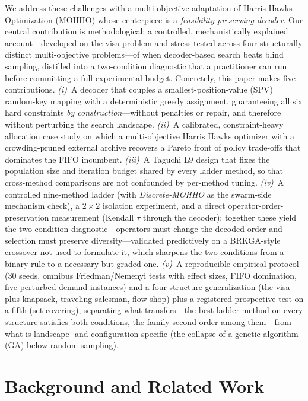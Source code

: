 \documentclass[runningheads]{llncs}
\begin{document}
We address these challenges with a multi-objective adaptation of Harris Hawks Optimization (MOHHO) whose centerpiece is a \emph{feasibility-preserving decoder}. Our central contribution is methodological: a controlled, mechanistically explained account---developed on the visa problem and stress-tested across four structurally distinct multi-objective problems---of when decoder-based search beats blind sampling, distilled into a two-condition diagnostic that a practitioner can run before committing a full experimental budget. Concretely, this paper makes five contributions. \emph{(i)}~A decoder that couples a smallest-position-value (SPV) random-key mapping with a deterministic greedy assignment, guaranteeing all six hard constraints \emph{by construction}---without penalties or repair, and therefore without perturbing the search landscape. \emph{(ii)}~A calibrated, constraint-heavy allocation case study on which a multi-objective Harris Hawks optimizer with a crowding-pruned external archive recovers a Pareto front of policy trade-offs that dominates the FIFO incumbent. \emph{(iii)}~A Taguchi L9 design that fixes the population size and iteration budget shared by every ladder method, so that cross-method comparisons are not confounded by per-method tuning. \emph{(iv)}~A controlled nine-method ladder (with \emph{Discrete-MOHHO} as the swarm-side mechanism check), a $2\times2$ isolation experiment, and a direct operator-order-preservation measurement (Kendall $\tau$ through the decoder); together these yield the two-condition diagnostic---operators must change the decoded order and selection must preserve diversity---validated predictively on a BRKGA-style crossover not used to formulate it, which sharpens the two conditions from a binary rule to a necessary-but-graded one. \emph{(v)}~A reproducible empirical protocol (30 seeds, omnibus Friedman/Nemenyi tests with effect sizes, FIFO domination, five perturbed-demand instances) and a four-structure generalization (the visa plus knapsack, traveling salesman, flow-shop) plus a registered prospective test on a fifth (set covering), separating what transfers---the best ladder method on every structure satisfies both conditions, the family second-order among them---from what is landscape- and configuration-specific (the collapse of a genetic algorithm (GA) below random sampling).

\section{Background and Related Work}
\label{sec:related}
\end{document}
